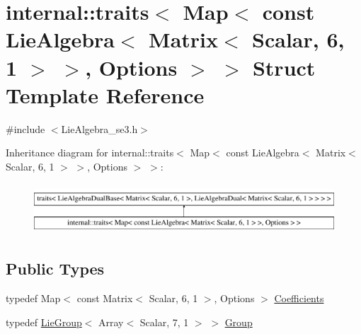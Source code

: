\hypertarget{structinternal_1_1traits_3_01_map_3_01const_01_lie_algebra_3_01_matrix_3_01_scalar_00_016_00_011bdc50eba447989365acf4f3cfd5e5212}{}\section{internal\+:\+:traits$<$ Map$<$ const Lie\+Algebra$<$ Matrix$<$ Scalar, 6, 1 $>$ $>$, Options $>$ $>$ Struct Template Reference}
\label{structinternal_1_1traits_3_01_map_3_01const_01_lie_algebra_3_01_matrix_3_01_scalar_00_016_00_011bdc50eba447989365acf4f3cfd5e5212}


{\ttfamily \#include $<$Lie\+Algebra\+\_\+se3.\+h$>$}

Inheritance diagram for internal\+:\+:traits$<$ Map$<$ const Lie\+Algebra$<$ Matrix$<$ Scalar, 6, 1 $>$ $>$, Options $>$ $>$\+:\begin{figure}[H]
\begin{center}
\leavevmode
\includegraphics[height=1.904762cm]{structinternal_1_1traits_3_01_map_3_01const_01_lie_algebra_3_01_matrix_3_01_scalar_00_016_00_011bdc50eba447989365acf4f3cfd5e5212}
\end{center}
\end{figure}
\subsection*{Public Types}
\begin{DoxyCompactItemize}
\item 
typedef Map$<$ const Matrix$<$ Scalar, 6, 1 $>$, Options $>$ \hyperlink{structinternal_1_1traits_3_01_map_3_01const_01_lie_algebra_3_01_matrix_3_01_scalar_00_016_00_011bdc50eba447989365acf4f3cfd5e5212_a9f0719d8c0161f53a3026c0d98dffa53}{Coefficients}
\item 
typedef \hyperlink{class_lie_group}{Lie\+Group}$<$ Array$<$ Scalar, 7, 1 $>$ $>$ \hyperlink{structinternal_1_1traits_3_01_map_3_01const_01_lie_algebra_3_01_matrix_3_01_scalar_00_016_00_011bdc50eba447989365acf4f3cfd5e5212_affc6fce5ea66d7dd41c559a4a6cc8e0d}{Group}
\end{DoxyCompactItemize}


